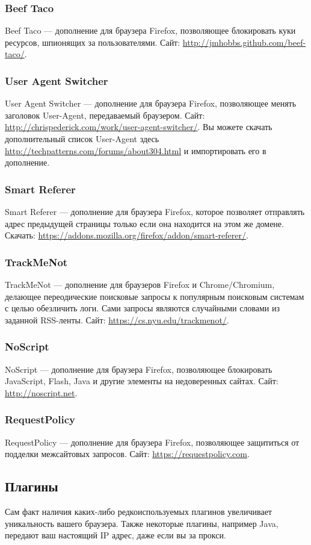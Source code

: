 \subsubsection{Beef Taco}
Beef Taco --- дополнение для браузера Firefox, позволяющее блокировать куки ресурсов, шпионящих за пользователями. Сайт: \url{http://jmhobbs.github.com/beef-taco/}.
\subsubsection{User Agent Switcher}
User Agent Switcher --- дополнение для браузера Firefox, позволяющее менять заголовок User-Agent, передаваемый браузером. Сайт: \url{http://chrispederick.com/work/user-agent-switcher/}. Вы можете скачать дополнительный список User-Agent здесь \url{http://techpatterns.com/forums/about304.html} и импортировать его в дополнение.
\subsubsection{Smart Referer}
Smart Referer --- дополнение для браузера Firefox, которое позволяет отправлять адрес предыдущей страницы только если она находится на этом же домене. Скачать: \url{https://addons.mozilla.org/firefox/addon/smart-referer/}.
\subsubsection{TrackMeNot}
TrackMeNot --- дополнение для браузеров Firefox и Chrome/Chromium, делающее переодические поисковые запросы к популярным поисковым системам с целью обезличить логи. Сами запросы являются случайными словами из заданной RSS-ленты. Сайт: \url{https://cs.nyu.edu/trackmenot/}.
\subsubsection{NoScript}
NoScript --- дополнение для браузера Firefox, позволяющее блокировать JavaScript, Flash, Java и другие элементы на недоверенных сайтах. Сайт: \url{http://noscript.net}.
\subsubsection{RequestPolicy}
RequestPolicy --- дополнение для браузера Firefox, позволяющее защититься от подделки межсайтовых запросов. Сайт: \url{https://requestpolicy.com}.
\subsection{Плагины}
Сам факт наличия каких-либо редкоиспользуемых плагинов увеличивает уникальность вашего браузера. Также некоторые плагины, например Java, передают ваш настоящий IP адрес, даже если вы за прокси.

